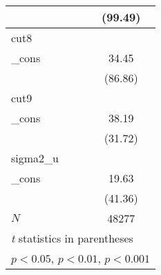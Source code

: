 {\begin{tabular}{l*{1}{c}}
            &     (99.49)         \\
\hline
cut8        &                     \\
\_cons      &       34.45\sym{***}\\
            &     (86.86)         \\
\hline
cut9        &                     \\
\_cons      &       38.19\sym{***}\\
            &     (31.72)         \\
\hline
sigma2\_u    &                     \\
\_cons      &       19.63\sym{***}\\
            &     (41.36)         \\
\hline
\(N\)       &       48277         \\
\hline\hline
\multicolumn{2}{l}{\footnotesize \textit{t} statistics in parentheses}\\
\multicolumn{2}{l}{\footnotesize \sym{*} \(p<0.05\), \sym{**} \(p<0.01\), \sym{***} \(p<0.001\)}\\
\end{tabular}
}
